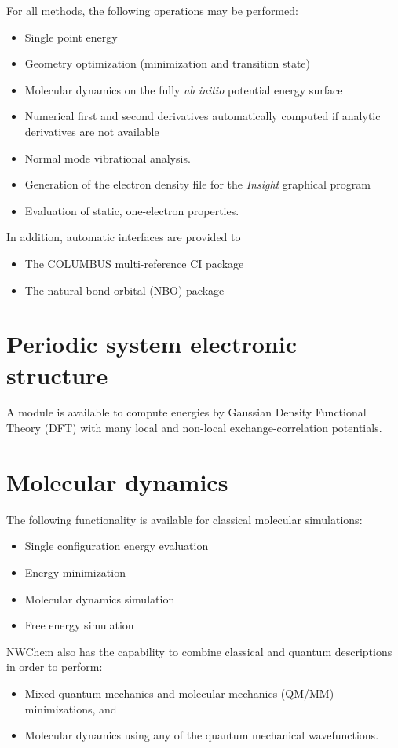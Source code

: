 For all methods, the following operations may be performed:
\begin{itemize}
\item Single point energy
\item Geometry optimization (minimization and transition state)
\item Molecular dynamics on the fully {\em ab initio} potential energy
  surface
\item Numerical first and second derivatives automatically computed if
  analytic derivatives are not available
\item Normal mode vibrational analysis.
\item Generation of the electron density file for the {\em Insight}
      graphical program
\item Evaluation of static, one-electron properties.
\end{itemize}

In addition, automatic interfaces are provided to
\begin{itemize}
\item The COLUMBUS multi-reference CI package
\item The natural bond orbital (NBO) package
\end{itemize}

\section{Periodic system electronic structure}

A module is available to compute energies by Gaussian Density
Functional Theory (DFT) with many local and non-local
exchange-correlation potentials.

\section{Molecular dynamics}

The following functionality is available for classical molecular
simulations:
\begin{itemize}
\item Single configuration energy evaluation
\item Energy minimization
\item Molecular dynamics simulation
\item Free energy simulation 
\end{itemize}

NWChem also has the capability to combine classical and quantum
descriptions in order to perform:
\begin{itemize}
\item Mixed quantum-mechanics and molecular-mechanics (QM/MM)
  minimizations, and
\item Molecular dynamics using any of the quantum
  mechanical wavefunctions.
\end{itemize}

